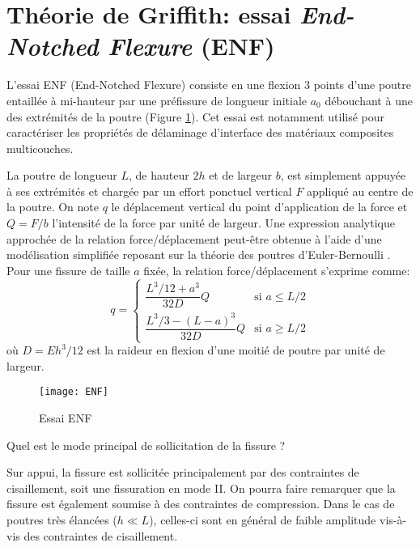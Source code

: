 \section{Théorie de Griffith: essai \textit{End-Notched Flexure} (ENF)}


L'essai ENF (End-Notched Flexure) consiste en une flexion 3 points d'une poutre entaillée à mi-hauteur par une préfissure de longueur initiale $a_0$ débouchant à une des extrémités de la poutre (Figure \ref{fig:ENF}). Cet essai est notamment utilisé pour caractériser les propriétés de délaminage d'interface des matériaux composites multicouches.

La poutre de longueur $L$, de hauteur $2h$ et de largeur $b$, est simplement appuyée à ses extrémités et chargée par un effort ponctuel vertical $F$ appliqué au centre de la poutre. On note $q$ le déplacement vertical du point d'application de la force et $Q = F/b$ l'intensité de la force par unité de largeur. Une expression analytique approchée de la relation force/déplacement peut-être obtenue à l'aide d'une modélisation simplifiée reposant sur la théorie des poutres d'Euler-Bernoulli \cite{allix1995damage}. Pour une fissure de taille $a$ fixée, la relation force/déplacement s'exprime comme:
\begin{equation}
q = \begin{cases}
\dfrac{L^3/12 + a^3}{32D}Q & \text{si } a\leq L/2\\
\dfrac{L^3/3 - (L-a)^3}{32D}Q & \text{si } a\geq L/2
\end{cases}
\end{equation}
où $D = E h^3/12$ est la raideur en flexion d'une moitié de poutre par unité de largeur.


\begin{figure}[h]
\begin{center}
\texttt{[image: ENF]}
\end{center}
\caption{Essai ENF}\label{fig:ENF}
\end{figure}

\begin{questions}
\setcounter{question}{-1}
\question Quel est le mode principal de sollicitation de la fissure ?
\begin{solution}
Sur appui, la fissure est sollicitée principalement par des contraintes de cisaillement, soit une fissuration en mode II. On pourra faire remarquer que la fissure est également soumise à des contraintes de compression. Dans le cas de poutres très élancées ($h \ll L$), celles-ci sont en général de faible amplitude vis-à-vis des contraintes de cisaillement.
\end{solution}
\end{questions}


